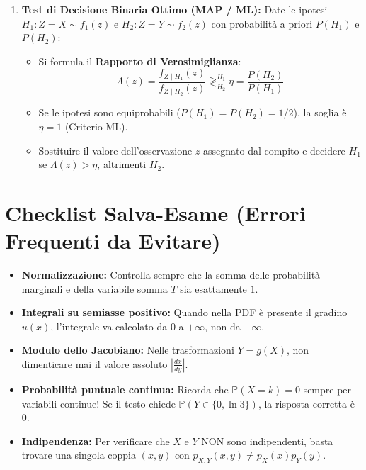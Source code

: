 \documentclass[a4paper, 10pt]{article}
\begin{document}
\begin{enumerate}
    \item \textbf{Test di Decisione Binaria Ottimo (MAP / ML):}
    Date le ipotesi $H_1: Z = X \sim f_1(z)$ e $H_2: Z = Y \sim f_2(z)$ con probabilità a priori $P(H_1)$ e $P(H_2)$:
    \begin{itemize}
        \item Si formula il \textbf{Rapporto di Verosimiglianza}:
        \[ \Lambda(z) = \frac{f_{Z \mid H_1}(z)}{f_{Z \mid H_2}(z)} \gtrless_{H_2}^{H_1} \eta = \frac{P(H_2)}{P(H_1)} \]
        \item Se le ipotesi sono equiprobabili ($P(H_1) = P(H_2) = 1/2$), la soglia è $\eta = 1$ (Criterio ML).
        \item Sostituire il valore dell'osservazione $z$ assegnato dal compito e decidere $H_1$ se $\Lambda(z) > \eta$, altrimenti $H_2$.
    \end{itemize}
\end{enumerate}

\section{Checklist Salva-Esame (Errori Frequenti da Evitare)}

\begin{itemize}
    \item[$\square$] \textbf{Normalizzazione:} Controlla sempre che la somma delle probabilità marginali e della variabile somma $T$ sia esattamente $1$.
    \item[$\square$] \textbf{Integrali su semiasse positivo:} Quando nella PDF è presente il gradino $u(x)$, l'integrale va calcolato da $0$ a $+\infty$, non da $-\infty$.
    \item[$\square$] \textbf{Modulo dello Jacobiano:} Nelle trasformazioni $Y = g(X)$, non dimenticare mai il valore assoluto $\left|\frac{dx}{dy}\right|$.
    \item[$\square$] \textbf{Probabilità puntuale continua:} Ricorda che $\mathbb{P}(X = k) = 0$ sempre per variabili continue! Se il testo chiede $\mathbb{P}(Y \in \{0, \ln 3\})$, la risposta corretta è $0$.
    \item[$\square$] \textbf{Indipendenza:} Per verificare che $X$ e $Y$ NON sono indipendenti, basta trovare una singola coppia $(x, y)$ con $p_{X,Y}(x,y) \neq p_X(x)p_Y(y)$.
\end{itemize}
\end{document}
